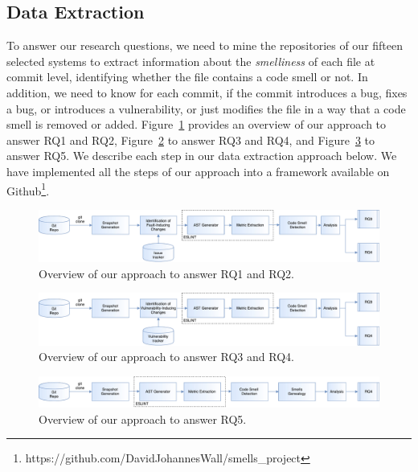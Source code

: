 \subsection{Data Extraction}\label{extraction}
To answer our research questions, we need to mine the repositories of our {\color{blue}fifteen} selected systems to extract information about the \emph{smelliness} of each file at commit level, identifying whether the file contains a code smell or not. In addition, we need to know for each commit, if the commit introduces a bug, fixes a bug{\color{blue}, or introduces a vulnerability,} or just modifies the file in a way that a code smell is removed or added. Figure~\ref{process} provides an overview of our approach {\color{blue}to answer RQ1 and RQ2, Figure~\ref{process2} to answer RQ3 and RQ4, and Figure~\ref{process3} to answer RQ5}. We describe each step in our data extraction approach below. We have implemented all the steps of our approach into a framework available on Github\footnote{https://github.com/DavidJohannesWall/smells\_project}.

\begin{figure}[t]
\captionsetup{font=small}
\centering%
	\includegraphics[scale=0.45]{pdfs/total.pdf}
	\caption{Overview of our approach to answer RQ1 and RQ2.}
\label{process}
\vspace{-15pt}
\end{figure}

\begin{figure}[t]
	\captionsetup{font=small}
	\centering%
	\includegraphics[scale=0.45]{pdfs/total2.pdf}
	\caption{Overview of our approach to answer RQ3 and RQ4.}
	\label{process2}
	\vspace{-15pt}
\end{figure}

\begin{figure}[t]
	\captionsetup{font=small}
	\centering%
	\includegraphics[scale=0.45]{pdfs/total3.pdf}
	\caption{Overview of our approach to answer RQ5.}
	\label{process3}
	\vspace{-15pt}
\end{figure}

